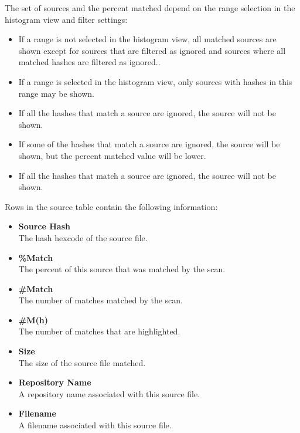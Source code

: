 \documentclass[11pt,fleqn]{article} %
\begin{document}
The set of sources and the percent matched depend on the range selection in the histogram view and filter settings:
\begin{itemize}
\item If a range is not selected in the histogram view, all matched sources are shown except for sources that are filtered as ignored and sources where all matched hashes are filtered as ignored..
\item If a range is selected in the histogram view, only sources with hashes in this range may be shown.
\item If all the hashes that match a source are ignored, the source will not be shown.
\item If some of the hashes that match a source are ignored, the source will be shown, but the percent matched value will be lower.
\item If all the hashes that match a source are ignored, the source will not be shown.
\end{itemize}
Rows in the source table contain the following information:
\begin{itemize}
\item \textbf{Source Hash}\\
The hash hexcode of the source file.
\item \textbf{\%Match}\\
The percent of this source that was matched by the scan.
\item \textbf{\#Match}\\
The number of matches matched by the scan.
\item \textbf{\#M(h)}\\
The number of matches that are highlighted.
\item \textbf{Size}\\
The size of the source file matched.
\item \textbf{Repository Name}\\
A repository name associated with this source file.
\item \textbf{Filename}\\
A filename associated with this source file.
\end{itemize}
\end{document}
